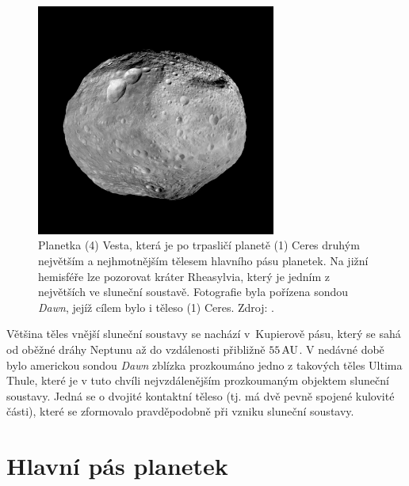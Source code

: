 \documentclass[A4paper, 12pt, oneside]{book}
\newcommand{\I}[1]{\textit{#1}}
\begin{document}
\begin{figure}
	\centering
	\includegraphics[width=0.7\textwidth]{obr/vesta.jpg}
	\caption{Planetka (4) Vesta, která je po trpasličí planetě (1) Ceres druhým největším a nejhmotnějším tělesem hlavního pásu planetek. Na jižní hemisféře lze pozorovat kráter Rheasylvia, který je jedním z největších ve sluneční soustavě. Fotografie byla pořízena sondou \I{Dawn}, jejíž cílem bylo i těleso (1) Ceres. Zdroj: \cite{jplvesta}.}
\end{figure}

Většina těles vnější sluneční soustavy se nachází v~Kupierově pásu, který se sahá od oběžné dráhy Neptunu až do vzdálenosti přibližně $55\, {\rm AU}$. V nedávné době bylo americkou sondou \I{Dawn} zblízka prozkoumáno jedno z takových těles Ultima Thule, které je v tuto chvíli nejvzdálenějším prozkoumaným objektem sluneční soustavy. Jedná se o dvojité kontaktní těleso (tj. má dvě pevně spojené kulovité části), které se zformovalo pravděpodobně při vzniku sluneční soustavy.

\section{Hlavní pás planetek}
\end{document}
